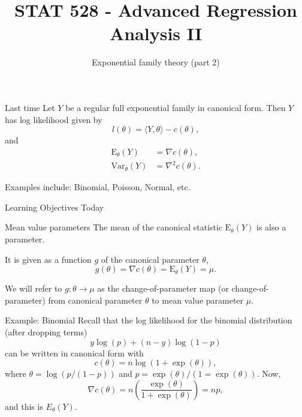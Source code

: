 \documentclass[
  ignorenonframetext,
]{beamer}
\title{STAT 528 - Advanced Regression Analysis II}
\author{Exponential family theory (part 2)}
\date{}
\institute{Daniel J. Eck\\
Department of Statistics\\
University of Illinois}
\begin{document}
\frame{\titlepage}

\begin{frame}
\newcommand{\R}{\mathbb{R}}
\newcommand{\Prob}{\mathbb{P}}
\newcommand{\Proj}{\textbf{P}}
\newcommand{\Hcal}{\mathcal{H}}
\newcommand{\rootn}{\sqrt{n}}
\newcommand{\p}{\mathbf{p}}
\newcommand{\E}{\text{E}}
\newcommand{\Var}{\text{Var}}
\newcommand{\Cov}{\text{Cov}}

\newtheorem{cor}{Corollary}
\newtheorem{lem}{Lemma}
\newtheorem{thm}{Theorem}
\newtheorem{defn}{Definition}
\newtheorem{prop}{Proposition}
\end{frame}

\begin{frame}{Last time}
\protect\hypertarget{last-time}{}
Let \(Y\) be a regular full exponential family in canonical form. Then
\(Y\) has log likelihood given by \[
  l(\theta) = \langle Y,\theta \rangle - c(\theta),
\] and \begin{align*} 
    \text{E}_\theta(Y) &= \nabla c(\theta),  \\
    \text{Var}_\theta(Y) &= \nabla^2 c(\theta).   
\end{align*}

Examples include: Binomial, Poisson, Normal, etc.
\end{frame}

\begin{frame}{Learning Objectives Today}
\protect\hypertarget{learning-objectives-today}{}
\end{frame}

\begin{frame}{Mean value parameters}
\protect\hypertarget{mean-value-parameters}{}
The mean of the canonical statistic \(\text{E}_\theta(Y)\) is also a
parameter.

It is given as a function \(g\) of the canonical parameter \(\theta\),
\begin{equation} \label{mvp}
  g(\theta) = \nabla c(\theta) = \text{E}_\theta(Y) = \mu.    
\end{equation}

We will refer to \(g:\theta\to\mu\) as the change-of-parameter map (or
change-of-parameter) from canonical parameter \(\theta\) to mean value
parameter \(\mu\).
\end{frame}

\begin{frame}{Example: Binomial}
\protect\hypertarget{example-binomial}{}
Recall that the log likelihood for the binomial distribution (after
dropping terms) \[
  y\log(p) + (n-y)\log(1-p)
\] can be written in canonical form with \[
  c(\theta) = n\log(1 + \exp(\theta)),
\] where \(\theta = \log(p/(1-p))\) and
\(p = \exp(\theta)/(1 = \exp(\theta))\). Now, \[
  \nabla c(\theta) = n \left(\frac{\exp(\theta)}{1 + \exp(\theta)}\right) = np,
\] and this is \(E_\theta(Y)\).
\end{frame}
\end{document}
